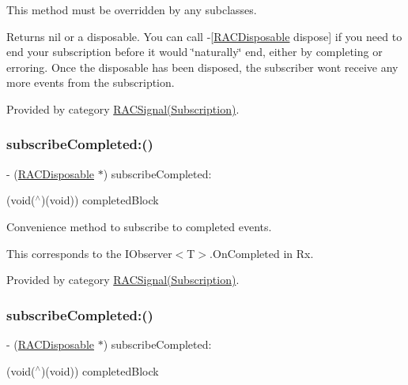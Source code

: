 This method must be overridden by any subclasses.

Returns nil or a disposable. You can call -\/\mbox{[}\mbox{\hyperlink{interface_r_a_c_disposable}{R\+A\+C\+Disposable}} dispose\mbox{]} if you need to end your subscription before it would \char`\"{}naturally\char`\"{} end, either by completing or erroring. Once the disposable has been disposed, the subscriber won\textquotesingle{}t receive any more events from the subscription. 

Provided by category \mbox{\hyperlink{category_r_a_c_signal_07_subscription_08_aeab76d632d98bbc321ec5e19575377eb}{R\+A\+C\+Signal(\+Subscription)}}.

\mbox{\label{interface_r_a_c_signal_a3927c94bfca5db9dad133dd7c45563f3}} 
\subsubsection{\texorpdfstring{subscribe\+Completed\+:()}{subscribeCompleted:()}\hspace{0.1cm}{\footnotesize\ttfamily [1/3]}}
{\footnotesize\ttfamily -\/ (\mbox{\hyperlink{interface_r_a_c_disposable}{R\+A\+C\+Disposable}} $\ast$) subscribe\+Completed\+: \begin{DoxyParamCaption}\item[{(void($^\wedge$)(void))}]{completed\+Block }\end{DoxyParamCaption}}

Convenience method to subscribe to {\ttfamily completed} events.

This corresponds to the {\ttfamily I\+Observer$<$T$>$.On\+Completed} in Rx. 

Provided by category \mbox{\hyperlink{category_r_a_c_signal_07_subscription_08_a3927c94bfca5db9dad133dd7c45563f3}{R\+A\+C\+Signal(\+Subscription)}}.

\mbox{\label{interface_r_a_c_signal_a3927c94bfca5db9dad133dd7c45563f3}} 
\subsubsection{\texorpdfstring{subscribe\+Completed\+:()}{subscribeCompleted:()}\hspace{0.1cm}{\footnotesize\ttfamily [2/3]}}
{\footnotesize\ttfamily -\/ (\mbox{\hyperlink{interface_r_a_c_disposable}{R\+A\+C\+Disposable}} $\ast$) subscribe\+Completed\+: \begin{DoxyParamCaption}\item[{(void($^\wedge$)(void))}]{completed\+Block }\end{DoxyParamCaption}}

